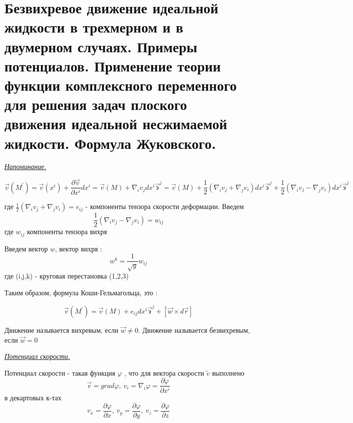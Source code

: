 \newpage
\section{Безвихревое движение идеальной жидкости в трехмерном и в двумерном случаях. Примеры потенциалов. Применение теории функции комплексного переменного для решения задач плоского движения идеальной несжимаемой жидкости. Формула Жуковского.}

\begin{center}
	\textit{\underline{Напоминание.}}
\end{center}



$$
\overrightarrow{v}(M^{'}) = \overrightarrow{v}(x^{i}) + \frac{\partial \overrightarrow{v}}{\partial x^{i}} dx^{i} = \overrightarrow{v}(M) + \nabla_{i} v_{j}dx^{i} \overrightarrow{\text{э}}^{j} = \overrightarrow{v}(M) + \frac{1}{2} (\nabla_i v_j + \nabla_j v_i) dx^{i} \overrightarrow{\text{э}}^{j} + \frac{1}{2} (\nabla_i v_j - \nabla_j v_i) dx^{i} \overrightarrow{\text{э}}^{j}
$$

где $\frac{1}{2} (\nabla_i v_j + \nabla_j v_i) = e_{ij}$ - компоненты тензора скорости деформации. Введем 
$$
\frac{1}{2} (\nabla_i v_j - \nabla_j v_i) = w_{ij}
$$
где $w_{ij}$ компоненты тензора вихря 

Введем вектор $w$, вектор вихря :
$$
w^{k} = \frac{1}{\sqrt{g}}w_{ij}
$$
где (i,j,k) - круговая перестановка (1,2,3)

Таким образом, формула Коши-Гельмагольца, это : 

$$
\overrightarrow{v}(M^{'}) = \overrightarrow{v}(M) + e_{ij} dx^{i} \overrightarrow{\text{э}}^{j} + [\overrightarrow{w} \times d\overrightarrow{r}]
$$

Движение называется вихревым, если $\overrightarrow{w} \neq 0$. Движение называется безвихревым, если $\overrightarrow{w} = 0$

\begin{center}
	\textit{\underline{Потенциал скорости.}}
\end{center}

Потенциал скорости - такая функция $\varphi$ , что для вектора скорости $\overleftrightarrow{v}$ выполнено 
$$
\overrightarrow{v} = grad \varphi, \ v_i = \nabla_i \varphi = \frac{\partial \varphi}{\partial x^i}
$$
в декартовых к-тах
$$
v_x = \frac{\partial \varphi}{\partial x}, \ v_y = \frac{\partial \varphi}{\partial y}, \ v_z = \frac{\partial \varphi}{\partial z}
$$

